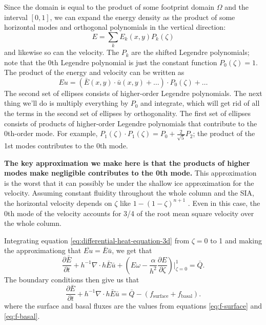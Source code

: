 \documentclass{article}
\theoremstyle{definition}
\theoremstyle{plain}
\begin{document}
Since the domain is equal to the product of some footprint domain $\Omega$ and the interval $[0, 1]$, we can expand the energy density as the product of some horizontal modes and orthogonal polynomials in the vertical direction:
\begin{equation}
    E = \sum_kE_k(x, y)P_k(\zeta)
\end{equation}
and likewise so can the velocity.
The $P_k$ are the shifted Legendre polynomials; note that the 0th Legendre polynomial is just the constant function $P_0(\zeta) = 1$.
The product of the energy and velocity can be written as
\begin{equation}
    Eu = \left(\bar E(x, y)\cdot\bar u(x, y) + \ldots\right)\cdot P_0(\zeta) + \ldots
\end{equation}
The second set of ellipses consists of higher-order Legendre polynomials.
The next thing we'll do is multiply everything by $P_0$ and integrate, which will get rid of all the terms in the second set of ellipses by orthogonality.
The first set of ellipses consists of products of higher-order Legendre polynomials that contribute to the 0th-order mode.
For example, $P_1(\zeta)\cdot P_1(\zeta) = P_0 + \frac{2}{\sqrt{5}}P_2$; the product of the 1st modes contributes to the 0th mode.

\textbf{The key approximation we make here is that the products of higher modes make negligible contributes to the 0th mode.}
This approximation is the worst that it can possibly be under the shallow ice approximation for the velocity.
Assuming constant fluidity throughout the whole column and the SIA, the horizontal velocity depends on $\zeta$ like $1 - (1 - \zeta)^{n + 1}$ \citep{greve2009dynamics}.
Even in this case, the 0th mode of the velocity accounts for 3/4 of the root mean square velocity over the whole column.

Integrating equation \eqref{eq:differential-heat-equation-3d} from $\zeta = 0$ to 1 and making the approximationg that $\overline{Eu} = \bar E\bar u$, we get that
\begin{equation}
    \frac{\partial\bar E}{\partial t} + h^{-1}\nabla\cdot h\bar E\bar u + \left(E\omega - \frac{\alpha}{h^2}\frac{\partial E}{\partial\zeta}\right)\Big|_{\zeta = 0}^1 = \bar Q.
\end{equation}
The boundary conditions then give us that
\begin{equation}
    \frac{\partial\bar E}{\partial t} + h^{-1}\nabla\cdot h\bar E\bar u = \bar Q - (f_{\text{surface}} + f_{\text{basal}}).
    \label{eq:strong-form}
\end{equation}
where the surface and basal fluxes are the values from equations \eqref{eq:f-surface} and \eqref{eq:f-basal}.
\end{document}
